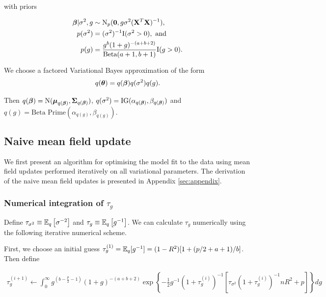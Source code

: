 \documentclass{amsart}[12pt]
\begin{document}
with priors

\begin{align*}
	{\boldsymbol\beta} | \sigma^2, g & \sim \text{N}_p({\bf 0}, g \sigma^2 ({\bf X}^T {\bf X})^{-1}),                    \\
	p(\sigma^2)          & = (\sigma^2)^{-1} \text{I}(\sigma^2 > 0), \text{ and }                   \\
	p(g)                 & = \frac{g^b (1 + g)^{-(a + b + 2)}}{\text{Beta}(a + 1, b + 1)} \text{I}(g > 0).
\end{align*}

We choose a factored Variational Bayes approximation of the form
\begin{align*}
	q({\boldsymbol \theta}) = q({\boldsymbol \beta}) q(\sigma^2) q(g). 
\end{align*}

Then $q({\boldsymbol \beta}) = \text{N}({\boldsymbol \mu}_{q({\boldsymbol \beta})}, {\boldsymbol \Sigma}_{q({\boldsymbol \beta})})$, $q(\sigma^2) = \text{IG}(\alpha_{q({\boldsymbol \beta})}, \beta_{q({\boldsymbol \beta})})$ and $q(g) = \text{Beta Prime}(\alpha_{q(g)}, \beta_{q(g)})$.

\subsection{Naive mean field update}
\label{sec:naive_mean_field_updates}

We first present an algorithm for optimising the model fit to the data using mean field updates performed
iteratively on all variational parameters. The derivation of the naive mean field updates is presented in
Appendix \ref{sec:appendix}.

\subsubsection{Numerical integration of $\tau_g$}
\label{sec:num_int}

Define $\tau_{\sigma^2} \equiv \mathbb{E}_q \left[ \sigma^{-2} \right]$ and $\tau_g \equiv \mathbb{E}_q \left[ g^{-1}
\right]$. We can calculate $\tau_g$ numerically using the following iterative numerical scheme.

First, we choose an initial guess $\tau_g^{(1)} = \mathbb{E}_q [g^{-1}] = (1 - R^2) [1 + (p / 2 + a + 1)/b]$. Then
define

\begin{align*}
	\tau_g^{(i+1)} \leftarrow \int_0^\infty g^{\left(b - \frac{p}{2} - 1\right)}                                   
	(1 + g)^{- (a + b + 2)}                                                                                        
	\exp \left \{- \frac{1}{2} g^{-1}  (1 + \tau_g^{(i)})^{-1} [\tau_{\sigma^2} (1 + \tau_g^{(i)})^{-1} n R^2 + p] 
	\right \} dg                                                                                                   
\end{align*}
\end{document}
